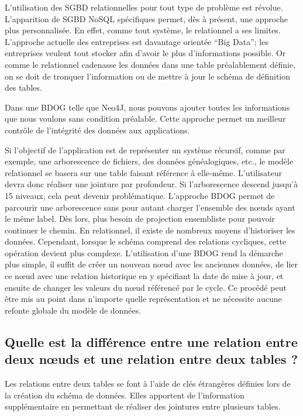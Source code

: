 \documentclass[a4paper,fleqn,12pt,oneside]{book}
\begin{document}
L’utilisation des SGBD relationnelles pour tout type de problème est révolue. L'apparition de SGBD NoSQL spécifiques permet, dès à présent, une approche plus personnalisée. En effet, comme tout système, le relationnel a ses limites. L’approche actuelle des entreprises est davantage orientée \enquote{Big Data}; les entreprises veulent tout stocker afin d’avoir le plus d’informations possible\cite{lohr2012age}. Or comme le relationnel cadenasse les données dans une table préalablement définie, on se doit de tronquer l'information ou de mettre à jour le schéma de définition des tables. 

Dans une BDOG telle que Neo4J, nous pouvons ajouter toutes les informations que nous voulons sans condition préalable. Cette approche permet un meilleur contrôle de l'intégrité des données aux applications.

Si l'objectif de l'application est de représenter un système récursif, comme par exemple, une arborescence de fichiers, des données généalogiques, etc., le modèle relationnel se basera sur une table faisant référence à elle-même. L’utilisateur devra donc réaliser une jointure par profondeur. Si l’arborescence descend jusqu’à 15 niveaux, cela peut devenir problématique\cite{miller2013graph}. L'approche BDOG permet de parcourir une arborescence sans pour autant charger l'ensemble des nœuds ayant le même label. Dès lors, plus besoin de projection ensembliste pour pouvoir continuer le chemin.
\newpage
En relationnel, il existe de nombreux moyens d’historiser les données. Cependant, lorsque le schéma comprend des relations cycliques, cette opération devient plus complexe. L'utilisation d'une BDOG rend la démarche plus simple, il suffit de créer un nouveau nœud avec les anciennes données, de lier ce nœud avec une relation historique en y spécifiant la date de mise à jour, et ensuite de changer les valeurs du nœud référencé par le cycle. Ce procédé peut être mis au point dans n’importe quelle représentation et ne nécessite aucune refonte globale du modèle de données\cite{NoSQLVsSGBDR}\label{noSqlVSRel}.

\subsection*{Quelle est la différence entre une relation entre deux nœuds et une relation entre deux tables ?}
Les relations entre deux tables se font à l’aide de clés étrangères définies lors de la création du schéma de données. Elles apportent de l’information supplémentaire en permettant de réaliser des jointures entre plusieurs tables.
\end{document}
